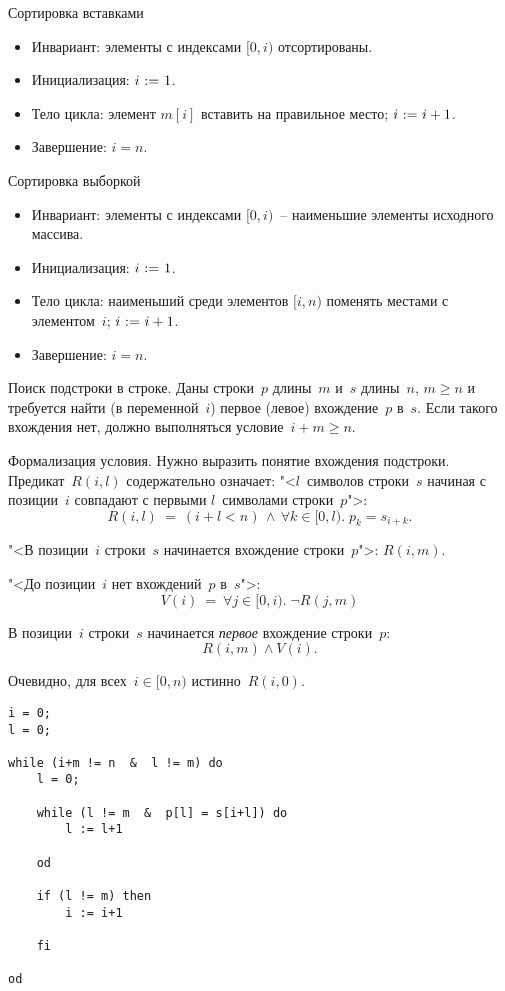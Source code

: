 \documentclass[landscape]{slides}
\begin{document}
\begin{slide}
Сортировка вставками
\begin{itemize}
    \item Инвариант: элементы с индексами $[0,i)$ отсортированы.
    \item Инициализация: $i\ \mathtt{:=}\  1$.
    \item Тело цикла: элемент $m[i]$ вставить на правильное место; $i\ \mathtt{:=}\  i+1$.
    \item Завершение: $i = n$.
\end{itemize}
\end{slide}

\begin{slide}
Сортировка выборкой
\begin{itemize}
    \item Инвариант: элементы с индексами $[0,i)$~-- наименьшие элементы исходного массива.
    \item Инициализация: $i\ \mathtt{:=}\  1$.
    \item Тело цикла: наименьший среди элементов $[i,n)$ поменять местами с элементом~$i$; $i\ \mathtt{:=}\  i+1$.
    \item Завершение: $i = n$.
\end{itemize}
\end{slide}

\begin{slide}
Поиск подстроки в строке. Даны строки~$p$ длины~$m$ и~$s$ длины~$n$, $m\geqslant n$ и требуется найти (в переменной~$i$) первое (левое) вхождение~$p$ в~$s$.
Если такого вхождения нет, должно выполняться условие~$i+m \geqslant n$.

Формализация условия. Нужно выразить понятие вхождения подстроки. Предикат~$R(i,l)$ содержательно означает: "<$l$~символов строки~$s$ начиная с позиции~$i$ совпадают с первыми $l$~символами строки~$p$">:
\[
R(i, l)\  =\  (i+l < n)\, \land\, \forall k\in[0,l).\; p_k = s_{i+k}.
\]

"<В позиции~$i$ строки~$s$ начинается вхождение строки~$p$">: $R(i,m)$.

"<До позиции~$i$ нет вхождений~$p$ в~$s$">:
\[
V(i)\ =\ \forall j\in[0,i).\; \neg R(j,m)
\]

В позиции~$i$ строки~$s$ начинается \emph{первое} вхождение строки~$p$:
\[
R(i,m) \land V(i) .
\]

Очевидно, для всех~$i\in[0,n)$ истинно~$R(i,0)$.
\end{slide}

\begin{slide}
\begin{verbatim}
i = 0;
l = 0;

while (i+m != n  &  l != m) do
    l = 0;

    while (l != m  &  p[l] = s[i+l]) do
        l := l+1
        
    od

    if (l != m) then
        i := i+1

    fi

od

\end{verbatim}
\end{slide}
\end{document}
